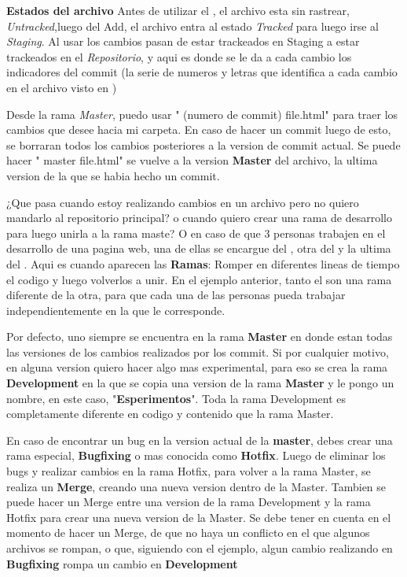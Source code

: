 \documentclass[]{article} %
\begin{document}
\textbf{Estados del archivo}
Antes de utilizar el , el archivo esta sin rastrear, \textit{Untracked},luego del Add, el archivo entra al estado \textit{Tracked} para luego irse al \textit{Staging}. Al usar  los cambios pasan de estar trackeados en Staging a estar trackeados en el \textit{Repositorio}, y aqui es donde se le da a cada cambio los indicadores del commit (la serie de numeros y letras que identifica a cada cambio en el archivo visto en )

Desde la rama \textit{Master}, puedo usar " (numero de commit) file.html" para traer los cambios que desee hacia mi carpeta.
En caso de hacer un commit luego de esto, se borraran todos los cambios posteriores a la version de commit actual.
Se puede hacer " master file.html" se vuelve a la version \textbf{Master} del archivo, la ultima version de la que se habia hecho un commit.


¿Que pasa cuando estoy realizando cambios en un archivo pero no quiero mandarlo al repositorio principal? o cuando quiero crear una rama de desarrollo para luego unirla a la rama maste? O en caso de que 3 personas trabajen en el desarrollo de una pagina web, una de ellas se encargue del , otra del  y la ultima del .
Aqui es cuando aparecen las \textbf{Ramas}: Romper en diferentes lineas de tiempo el codigo y luego volverlos a unir. En el ejemplo anterior, tanto el  son una rama diferente de la otra, para que cada una de las personas pueda trabajar independientemente en la que le corresponde.

Por defecto, uno siempre se encuentra en la rama \textbf{Master} en donde estan todas las versiones de los cambios realizados por los commit. Si por cualquier motivo, en alguna version quiero hacer algo mas experimental, para eso se crea la rama \textbf{Development} en la que se copia una version de la rama \textbf{Master} y le pongo un nombre, en este caso, "\textbf{Esperimentos}". Toda la rama Development es completamente diferente en codigo y contenido que la rama Master.

En caso de encontrar un bug en la version actual de la \textbf{master}, debes crear una rama especial, \textbf{Bugfixing} o mas conocida como \textbf{Hotfix}. Luego de eliminar los bugs y realizar cambios en la rama Hotfix, para volver a la rama Master, se realiza un \textbf{Merge}, creando una nueva version dentro de la Master. Tambien se puede hacer un Merge entre una version de la rama Development y la rama Hotfix para crear una nueva version de la Master.
Se debe tener en cuenta en el momento de hacer un Merge, de que no haya un conflicto en el que algunos archivos se rompan, o que, siguiendo con el ejemplo, algun cambio realizando en \textbf{Bugfixing} rompa un cambio en \textbf{Development}
\end{document}
